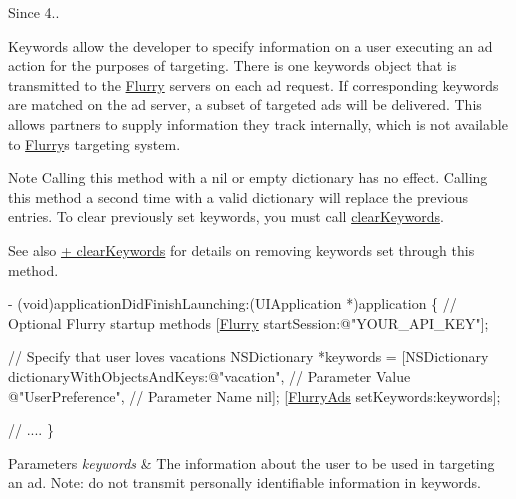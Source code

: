 \begin{DoxySince}{Since}
4..
\end{DoxySince}
Keywords allow the developer to specify information on a user executing an ad action for the purposes of targeting. There is one keywords object that is transmitted to the \hyperlink{interfaceFlurry}{Flurry} servers on each ad request. If corresponding keywords are matched on the ad server, a subset of targeted ads will be delivered. This allows partners to supply information they track internally, which is not available to \hyperlink{interfaceFlurry}{Flurry}\textquotesingle{}s targeting system.

\begin{DoxyNote}{Note}
Calling this method with a nil or empty dictionary has no effect. Calling this method a second time with a valid dictionary will replace the previous entries. To clear previously set keywords, you must call \hyperlink{interfaceFlurryAds_a4126bd3f3c8d8b48e77f5b6eb2788e78}{clear\+Keywords}. 
\end{DoxyNote}
\begin{DoxySeeAlso}{See also}
\hyperlink{interfaceFlurryAds_a4126bd3f3c8d8b48e77f5b6eb2788e78}{+ clear\+Keywords} for details on removing keywords set through this method.
\end{DoxySeeAlso}

\begin{DoxyCode}
   - (void)applicationDidFinishLaunching:(UIApplication *)application 
   \{
       \textcolor{comment}{// Optional Flurry startup methods}
       [\hyperlink{interfaceFlurry}{Flurry} startSession:\textcolor{stringliteral}{@"YOUR\_API\_KEY"}];

       \textcolor{comment}{// Specify that user loves vacations}
       NSDictionary *keywords =
           [NSDictionary dictionaryWithObjectsAndKeys:\textcolor{stringliteral}{@"vacation"}, \textcolor{comment}{// Parameter Value}
           \textcolor{stringliteral}{@"UserPreference"}, \textcolor{comment}{// Parameter Name}
           nil];
           [\hyperlink{interfaceFlurryAds}{FlurryAds} setKeywords:keywords];

\textcolor{comment}{// ....}
\}
\end{DoxyCode}



\begin{DoxyParams}{Parameters}
{\em keywords} & The information about the user to be used in targeting an ad. Note\+: do not transmit personally identifiable information in keywords. \\
\hline
\end{DoxyParams}
\mbox{\label{interfaceFlurryAds_ab24e531118ba482ff41fcf695a21de39}} 
